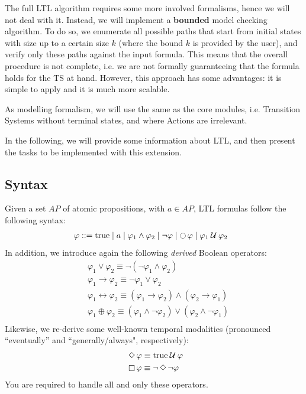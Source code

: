 \documentclass{article}
\begin{document}
The full LTL algorithm requires some more involved formalisms, hence we will not deal with it. Instead, we will implement a \textbf{bounded} model checking algorithm. To do so, we enumerate all possible paths that start from initial states with size up to a certain size $k$ (where the bound $k$ is provided by the user), and verify only these paths against the input formula. This means that the overall procedure is not complete, i.e. we are not formally guaranteeing that the formula holds for the TS at hand. However, this approach has some advantages: it is simple to apply and it is much more scalable. 

As modelling formalism, we will use the same as the core modules, i.e. Transition Systems without terminal states, and where Actions are irrelevant.

In the following, we will provide some information about LTL, and then present the tasks to be implemented with this extension.

\subsection*{Syntax}
Given a set $AP$ of atomic propositions, with $a \in AP$, LTL formulas follow the following syntax: 
\begin{align*}
    &\; \varphi ::= \text{true} \mid a \mid \varphi_1 \land \varphi_2 \mid \neg \varphi \mid \mathop{\ocircle}{\varphi} \mid \varphi_1 \mathbin{\mathcal{U}} \varphi_2
\end{align*}
In addition, we introduce again the following \emph{derived} Boolean operators: 
\begin{align*}
    &\; \varphi_1 \lor \varphi_2 \equiv \neg (\neg \varphi_1 \land \varphi_2) \\
    &\; \varphi_1 \rightarrow \varphi_2 \equiv \neg \varphi_1 \lor \varphi_2 \\
    &\; \varphi_1 \leftrightarrow  \varphi_2 \equiv (\varphi_1 \rightarrow \varphi_2) \land (\varphi_2 \rightarrow \varphi_1) \\
    &\; \varphi_1 \oplus  \varphi_2 \equiv (\varphi_1 \land \neg \varphi_2) \lor (\varphi_2 \land \neg \varphi_1)\\
\end{align*}
Likewise, we re-derive some well-known temporal modalities (pronounced ``eventually'' and ``generally/always", respectively):
\begin{align*}
    &\; \mathop{\Diamond} \varphi \equiv \text{true} \mathbin{\mathcal{U}} \varphi \\
    &\; \mathop{\square} \varphi \equiv \neg \mathop{\Diamond} \neg \varphi \\
\end{align*}
You are required to handle all and only these operators.
\end{document}

